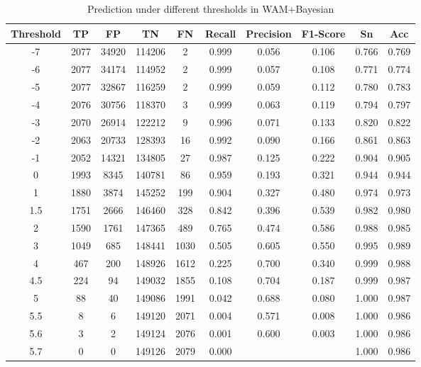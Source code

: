 \documentclass{gapd}
\begin{document}
\begin{table}[hbp]
  \centering
  \caption{Prediction under different thresholds in WAM+Bayesian}
  \begin{tabular}{cccccccccc}
  \toprule%
      Threshold & TP & FP & TN & FN & Recall & Precision & F1-Score & Sn & Acc \\ 
      \midrule%
      -7 & 2077 & 34920 & 114206 & 2 & 0.999 & 0.056 & 0.106 & 0.766 & 0.769 \\ 
      -6 & 2077 & 34174 & 114952 & 2 & 0.999 & 0.057 & 0.108 & 0.771 & 0.774 \\ 
      -5 & 2077 & 32867 & 116259 & 2 & 0.999 & 0.059 & 0.112 & 0.780 & 0.783 \\ 
      -4 & 2076 & 30756 & 118370 & 3 & 0.999 & 0.063 & 0.119 & 0.794 & 0.797 \\ 
      -3 & 2070 & 26914 & 122212 & 9 & 0.996 & 0.071 & 0.133 & 0.820 & 0.822 \\ 
      -2 & 2063 & 20733 & 128393 & 16 & 0.992 & 0.090 & 0.166 & 0.861 & 0.863 \\ 
      -1 & 2052 & 14321 & 134805 & 27 & 0.987 & 0.125 & 0.222 & 0.904 & 0.905 \\ 
      0 & 1993 & 8345 & 140781 & 86 & 0.959 & 0.193 & 0.321 & 0.944 & 0.944 \\ 
      1 & 1880 & 3874 & 145252 & 199 & 0.904 & 0.327 & 0.480 & 0.974 & 0.973 \\ 
      1.5 & 1751 & 2666 & 146460 & 328 & 0.842 & 0.396 & 0.539 & 0.982 & 0.980 \\ 
      2 & 1590 & 1761 & 147365 & 489 & 0.765 & 0.474 & 0.586 & 0.988 & 0.985 \\ 
      3 & 1049 & 685 & 148441 & 1030 & 0.505 & 0.605 & 0.550 & 0.995 & 0.989 \\ 
      4 & 467 & 200 & 148926 & 1612 & 0.225 & 0.700 & 0.340 & 0.999 & 0.988 \\ 
      4.5 & 224 & 94 & 149032 & 1855 & 0.108 & 0.704 & 0.187 & 0.999 & 0.987 \\ 
      5 & 88 & 40 & 149086 & 1991 & 0.042 & 0.688 & 0.080 & 1.000 & 0.987 \\ 
      5.5 & 8 & 6 & 149120 & 2071 & 0.004 & 0.571 & 0.008 & 1.000 & 0.986 \\ 
      5.6 & 3 & 2 & 149124 & 2076 & 0.001 & 0.600 & 0.003 & 1.000 & 0.986 \\ 
      5.7 & 0 & 0 & 149126 & 2079 & 0.000 &  &  & 1.000 & 0.986 \\ 
      \bottomrule%
  \end{tabular}
\end{table}
\end{document}
